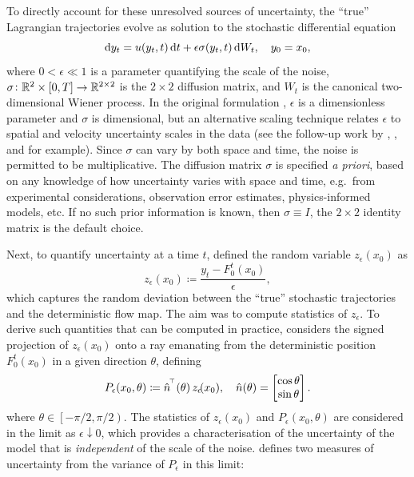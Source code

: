 To directly account for these unresolved sources of uncertainty, the ``true'' Lagrangian trajectories evolve as solution to the stochastic differential equation
\begin{equation}
	\sde{y_t}{u\!\left(y_t, t\right)}{\epsilon\sigma\!\left(y_t, t\right)}, \quad y_0 = x_0
	\label{eqn:s2_sde},
\end{equation}
where \(0 < \epsilon \ll 1\) is a parameter quantifying the scale of the noise, \(\sigma\colon	\mathbb{R}^2\times[0,T] \to \mathbb{R}^{2\times 2}\) is the \(2\times 2\) diffusion matrix, and \(W_t\) is the canonical two-dimensional Wiener process.
In the original formulation \citep{Balasuriya_2020_StochasticSensitivityComputable}, \(\epsilon\) is a dimensionless parameter and \(\sigma\) is dimensional, but an alternative scaling technique relates \(\epsilon\) to spatial and velocity uncertainty scales in the data (see the follow-up work by \citet{Balasuriya_2020_UncertaintyFinitetimeLyapunov}, \citet{FangEtAl_2020_DisentanglingResolutionPrecision}, and \citet{BadzaEtAl_2023_HowSensitiveAre} for example).
Since \(\sigma\) can vary by both space and time, the noise is permitted to be multiplicative.
The diffusion matrix \(\sigma\) is specified \emph{a priori}, based on any knowledge of how uncertainty varies with space and time, e.g.\ from experimental considerations, observation error estimates, physics-informed models, etc.
If no such prior information is known, then \(\sigma \equiv I\), the \(2 \times 2\) identity matrix is the default choice.

Next, to quantify uncertainty at a time \(t\), \citet{Balasuriya_2020_StochasticSensitivityComputable} defined the random variable \(z_\epsilon\left(x_0\right)\) as
\[
	z_\epsilon\!\left(x_0\right) \coloneqq \frac{y_t - F_0^t\!\left(x_0\right)}{\epsilon},
\]
which captures the random deviation between the ``true'' stochastic trajectories and the deterministic flow map.
The aim was to compute statistics of \(z_\epsilon\).
To derive such quantities that can be computed in practice, \citet{Balasuriya_2020_StochasticSensitivityComputable} considers the signed projection of \(z_\epsilon\!\left(x_0\right)\) onto a ray emanating from the deterministic position \(F_0^t\!\left(x_0\right)\) in a given direction \(\theta\), defining
\[
	P_\epsilon\!\left(x_0,\theta\right) \coloneqq \hat{n}^{^{\!\top}}\!\left(\theta\right) z_\epsilon\!(x_0), \quad \hat{n}\!\left(\theta\right) = \begin{bmatrix}
		\cos{\theta} \\
		\sin{\theta}
	\end{bmatrix}.
\]
where \(\theta \in \left[-\pi/2, \pi/2\right)\).
The statistics of \(z_\epsilon\!\left(x_0\right)\) and \(P_\epsilon\!\left(x_0,\theta\right)\) are considered in the limit as \(\epsilon\downarrow 0\), which provides a characterisation of the uncertainty of the model that is \emph{independent} of the scale of the noise.
\citet{Balasuriya_2020_StochasticSensitivityComputable} defines two measures of uncertainty from the variance of \(P_\epsilon\) in this limit:  %

